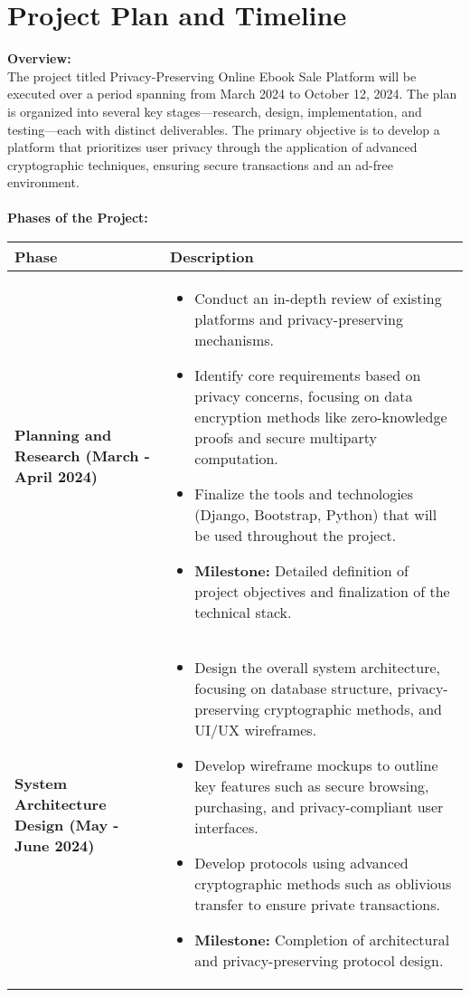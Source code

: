 \documentclass[12pt]{article}
\begin{document}
\section{Project Plan and Timeline}
\textbf{Overview:}\\
The project titled Privacy-Preserving Online Ebook Sale Platform will be executed over a period spanning from March 2024 to October 12, 2024. The plan is organized into several key stages—research, design, implementation, and testing—each with distinct deliverables. The primary objective is to develop a platform that prioritizes user privacy through the application of advanced cryptographic techniques, ensuring secure transactions and an ad-free environment.\\\\
\textbf{Phases of the Project:}
\begin{longtable}{|>{\bfseries}m{5cm}|m{10cm}|}
	\hline
	\textbf{Phase} & \textbf{Description} \\
	\hline
	Planning and Research (March - April 2024) & 
	\begin{itemize}
		\item Conduct an in-depth review of existing platforms and privacy-preserving mechanisms.
		\item Identify core requirements based on privacy concerns, focusing on data encryption methods like zero-knowledge proofs and secure multiparty computation.
		\item Finalize the tools and technologies (Django, Bootstrap, Python) that will be used throughout the project.
		\item \textbf{Milestone:} Detailed definition of project objectives and finalization of the technical stack.
	\end{itemize}
	\\
	\hline
	System Architecture Design (May - June 2024) & 
	\begin{itemize}
		\item Design the overall system architecture, focusing on database structure, privacy-preserving cryptographic methods, and UI/UX wireframes.
		\item Develop wireframe mockups to outline key features such as secure browsing, purchasing, and privacy-compliant user interfaces.
		\item Develop protocols using advanced cryptographic methods such as oblivious transfer to ensure private transactions.
		\item \textbf{Milestone:} Completion of architectural and privacy-preserving protocol design.

\end{itemize}
\end{longtable}
\end{document}

